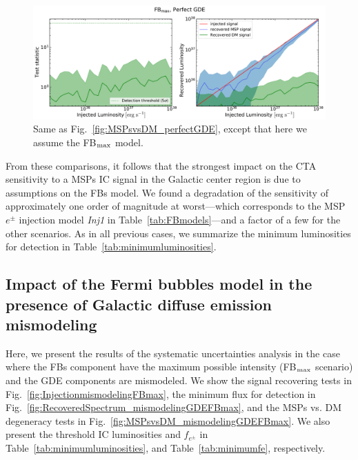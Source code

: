 \documentclass[doublespace,nopageskip]{VTthesis}
\begin{document}
\begin{figure}[htb]
    \begin{center}
    \includegraphics[width=\textwidth]{Figures/CTA/TS-dm-mis-False-Fermi-min-False.pdf}
\caption{Same as Fig.~\ref{fig:MSPsvsDM_perfectGDE}, except that here we assume the FB$_{\rm max}$ model.}\label{fig:MSPsvsDM_perfectGDEFBmax}
    \end{center}
\end{figure}

From these comparisons, it follows that the strongest impact on the CTA sensitivity to a MSPs IC signal in the Galactic center region is due to assumptions on the FBs model. We found a degradation of the sensitivity of approximately one order of magnitude at worst---which corresponds to the MSP $e^\pm$ injection model \textit{Inj1} in Table~\ref{tab:FBmodels}---and a factor of a few for the other scenarios. As in all previous cases, we summarize the minimum luminosities for detection in Table~\ref{tab:minimumluminosities}.  

\subsection{Impact of the Fermi bubbles model in the presence of Galactic diffuse emission mismodeling}
\label{appdx:FBmaxandmismodeling}

Here, we present the results of the systematic uncertainties analysis in the case where the FBs component have the maximum possible intensity (FB$_{\rm max}$ scenario) and the GDE components are mismodeled. We show the signal recovering tests in Fig.~\ref{fig:InjectionmismodelingFBmax}, the minimum flux for detection in Fig.~\ref{fig:RecoveredSpectrum_mismodelingGDEFBmax}, and the MSPs vs. DM degeneracy tests in Fig.~\ref{fig:MSPsvsDM_mismodelingGDEFBmax}. We also present the threshold IC luminosities and $f_{e^\pm}$ in Table~\ref{tab:minimumluminosities}, and Table~\ref{tab:minimumfe}, respectively.
\end{document}
